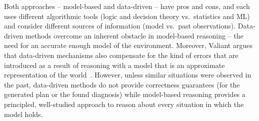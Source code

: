 \documentclass[12pt]{article}
\begin{document}
Both approaches -- model-based and data-driven --  have pros and cons, and each uses different algorithmic tools (logic and decision theory vs.~statistics and ML) and consider different sources of information (model vs.~past observations). Data-driven methods overcome an inherent obstacle in model-based reasoning -- the need for an accurate enough model of the environment. Moreover, Valiant argues that  data-driven mechanisms also compensate for the kind of errors that are introduced as a result of  reasoning with a model that is an approximate representation of the world~\cite{valiant2000neuroidal,valiant2000robustLogics}.
However, unless similar situations were observed in the past, data-driven methods do not provide correctness guarantees (for the generated plan or the found diagnosis)  
while model-based reasoning provides a principled,  well-studied approach to reason about every situation in which the model holds. %



 
\end{document}
